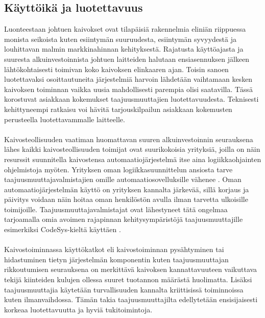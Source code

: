 \documentclass[finnish,12pt,a4paper,pdftex,elec,utf8]{aaltothesis}
\begin{document}

\subsection{Käyttöikä ja luotettavuus}
Luonteestaan johtuen kaivokset ovat tilapäisiä rakennelmia eliniän riippuessa monista seikoista kuten esiintymän suuruudesta, esiintymän syvyydestä ja louhittavan malmin markkinahinnan kehityksestä. Rajatusta käyttöajasta ja suuresta alkuinvestoinnista johtuen laitteiden halutaan ensiasennuksen jälkeen lähtökohtaisesti toimivan koko kaivoksen elinkaaren ajan. Toisin sanoen luotettavaksi osoittautuneita järjestelmiä harvoin lähdetään vaihtamaan kesken kaivoksen toiminnan vaikka uusia mahdollisesti parempia olisi saatavilla. Tässä korostuvat asiakkaan kokemukset taajuusmuuttajien luotettavuudesta. Teknisesti kehittyneempi ratkaisu voi hävitä tarjouskilpailun asiakkaan kokemusten perusteella luotettavammalle laitteelle. \cite{MyyntiHaastattelu}
\\\\
Kaivosteollisuuden vaatiman huomattavan suuren alkuinvestoinnin seurauksena lähes kaikki kaivosteollisuuden toimijat ovat suurikokoisia yrityksiä, joilla on näin resurssit suunnitella kaivostensa automaatiojärjestelmä itse aina logiikkaohjainten ohjelmistoja myöten. Yrityksen oman logiikkasuunnittelun ansiosta tarve taajuusmuuttajavalmistajien omille automaatiosovelluksille vähenee \cite{MyyntiHaastattelu}. Oman automaatiojärjestelmän käyttö on yrityksen kannalta järkevää, sillä korjaus ja päivitys voidaan näin hoitaa oman henkilöstön avulla ilman tarvetta ulkoisille toimijoille. \cite{MyyntiHaastattelu} Taajuusmuuttajavalmistajat ovat lähestyneet tätä ongelmaa tarjoamalla omia avoimen rajapinnan kehitysympäristöjä taajuusmuuttajille esimerkiksi CodeSys-kieltä käyttäen \cite{880hwman}.
\\\\
Kaivostoiminnassa käyttökatkot eli kaivostoiminnan pysähtyminen tai hidastuminen tietyn järjestelmän komponentin kuten taajuusmuuttajan rikkoutumisen seurauksena on merkittävä kaivoksen kannattavuuteen vaikuttava tekijä kiinteiden kulujen ollessa suuret tuotannon määrästä huolimatta. Lisäksi taajuusmuuttajia käytetään turvallisuuden kannalta kriittisissä toiminnoissa kuten ilmanvaihdossa. Tämän takia taajuusmuuttajilta edellytetään ensisijaisesti korkeaa luotettavuutta ja hyviä tukitoimintoja. \cite{MyyntiHaastattelu}
\end{document}
